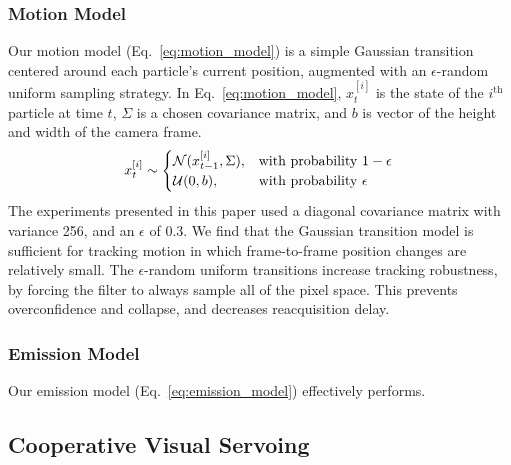 \documentclass{aamas2013}
\begin{document}
\subsubsection{Motion Model}
Our motion model (Eq.~\ref{eq:motion_model}) is a simple Gaussian transition 
centered around each particle's current position, augmented with an 
$\epsilon$-random uniform sampling strategy. In Eq.~\ref{eq:motion_model}, 
$x^{[i]}_t$ is the state of the $i^\text{th}$ particle at time $t$, $\Sigma$ 
is a chosen covariance matrix, and $b$ is vector of the height and width of 
the camera frame.
\begin{equation}
\label{eq:motion_model}
x^{[i]}_t \sim \begin{cases}
\mathcal{N}(x^{[i]}_{t-1}, \Sigma), &\text{with probability } 1-\epsilon \\
\mathcal{U}(0,b),& \text{with probability } \epsilon \\
\end{cases}\\
\end{equation}
The experiments presented in this paper used a diagonal covariance matrix 
with variance 256, and an $\epsilon$ of 0.3. We find that the Gaussian 
transition model is sufficient for tracking motion in which frame-to-frame 
position changes are relatively small. The $\epsilon$-random uniform 
transitions increase tracking robustness, by forcing the filter to always 
sample all of the pixel space. This prevents overconfidence and collapse, 
and decreases reacquisition delay. 

\subsubsection{Emission Model}
Our emission model (Eq.~\ref{eq:emission_model}) effectively performs.



\subsection{Cooperative Visual Servoing}
\label{sec:visual_servoing_concept}
\end{document}
